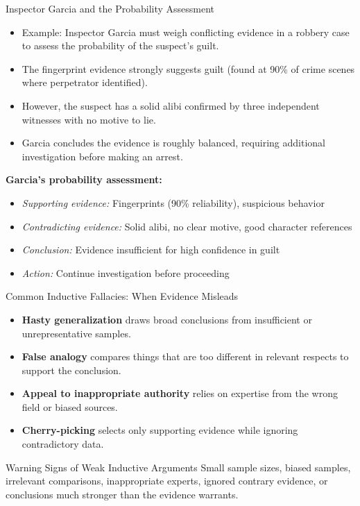 \documentclass{beamer}
\begin{document}
\begin{frame}{Inspector Garcia and the Probability Assessment}
	\begin{itemize}
		\item Example: Inspector Garcia must weigh conflicting evidence in a robbery case to assess the probability of the suspect's guilt.
		\item The fingerprint evidence strongly suggests guilt (found at 90\% of crime scenes where perpetrator identified).
		\item However, the suspect has a solid alibi confirmed by three independent witnesses with no motive to lie.
		\item Garcia concludes the evidence is roughly balanced, requiring additional investigation before making an arrest.
	\end{itemize}
	
	\begin{example}
		\scriptsize
		\textbf{Garcia's probability assessment:}
		\begin{itemize}
			\item \textit{Supporting evidence:} Fingerprints (90\% reliability), suspicious behavior
			\item \textit{Contradicting evidence:} Solid alibi, no clear motive, good character references
			\item \textit{Conclusion:} Evidence insufficient for high confidence in guilt
			\item \textit{Action:} Continue investigation before proceeding
		\end{itemize}
	\end{example}
\end{frame}

\begin{frame}{Common Inductive Fallacies: When Evidence Misleads}
	\begin{itemize}
		\item \textbf{Hasty generalization} draws broad conclusions from insufficient or unrepresentative samples.
		\item \textbf{False analogy} compares things that are too different in relevant respects to support the conclusion.
		\item \textbf{Appeal to inappropriate authority} relies on expertise from the wrong field or biased sources.
		\item \textbf{Cherry-picking} selects only supporting evidence while ignoring contradictory data.
	\end{itemize}
	
	\begin{alertblock}{Warning Signs of Weak Inductive Arguments}
		Small sample sizes, biased samples, irrelevant comparisons, inappropriate experts, ignored contrary evidence, or conclusions much stronger than the evidence warrants.
	\end{alertblock}
\end{frame}
\end{document}
